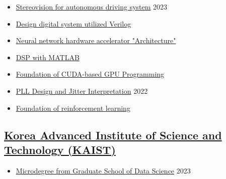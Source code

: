 \documentclass[a4paper,9pt]{extarticle}
\begin{document}
\begin{itemize}
    \item \href{https://github.com/user-attachments/assets/2d45999d-1f66-467c-b956-e16b5ed71593}{Stereovision for autonomous driving system}                            \hfill 2023
    \item \href{https://github.com/user-attachments/assets/32bfc1d6-18cf-44a4-83dc-209b4f4686ac}{Design digital system utilized Verilog}
    \item \href{https://github.com/user-attachments/assets/094a58df-f320-45fb-aba3-707f4a7fd8f7}{Neural network hardware accelerator "Architecture"}
    \item \href{https://github.com/user-attachments/assets/9f74252d-eae5-40b2-b305-ea90576100aa}{DSP with MATLAB}
    \item \href{https://github.com/user-attachments/assets/0fc8c167-bef1-4857-a664-a1b82c95e306}{Foundation of CUDA-based GPU Programming}    
\end{itemize}
\begin{itemize}
    \item \href{https://github.com/user-attachments/assets/b4e013f1-d7b8-4505-a4f5-12e270097549}{PLL Design and Jitter Interpretation}                                  \hfill 2022
    \item \href{https://github.com/user-attachments/assets/73933790-2b15-46ae-8ac2-c6eaf31d9e01}{Foundation of reinforcement learning}                                  
\end{itemize}


\subsection*{\href{https://www.kocw.net/home/index.do}{Korea Advanced Institute of Science and Technology (KAIST)}}
\begin{itemize}
    \item \href{https://github.com/user-attachments/assets/b404e1df-2798-48de-8385-c9a6c7389b38}{Microdegree from Graduate School of Data Science}                    \hfill 2023
\end{itemize}
\end{document}
